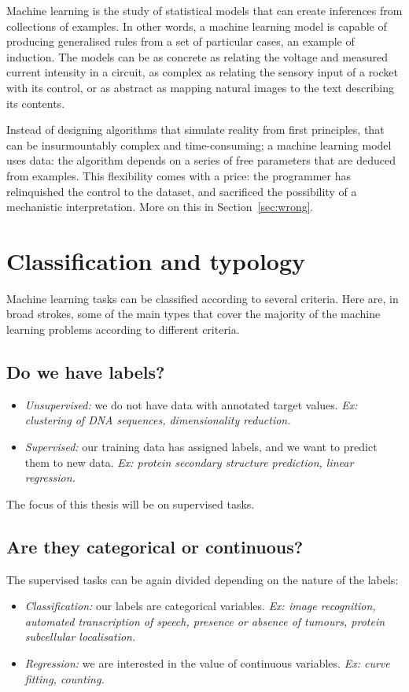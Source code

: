 Machine learning 
is the study of statistical models that can create inferences from collections of examples. 
In other words, a machine learning model is capable of producing generalised rules from a set of particular cases, an example of induction.
The models can be as concrete as relating the voltage and measured current intensity in a circuit, as complex as relating the sensory input of a rocket with its control, or as abstract as mapping natural images to the text describing its contents.

Instead of designing algorithms that simulate reality from first principles, that can be insurmountably complex and time-consuming; a machine learning model uses data: the algorithm depends on a series of free parameters that are deduced from examples.
This flexibility comes with a price: the programmer has relinquished the control to the dataset, and sacrificed the possibility of a mechanistic interpretation.
More on this in Section~\ref{sec:wrong}.

\section{Classification and typology}
Machine learning tasks can be classified according to several criteria.
Here are, in broad strokes, some of the main types that cover the majority of the machine learning problems according to different criteria.

\subsection{Do we have labels?}
\begin{itemize}
\item \emph{Unsupervised:} we do not have data with annotated target values. \emph{Ex: clustering of DNA sequences, dimensionality reduction.}
\item \emph{Supervised:} our training data has assigned labels, and we want to predict them to new data. \emph{Ex: protein secondary structure prediction, linear regression.}
\end{itemize}

The focus of this thesis will be on supervised tasks.

\subsection[Categorical or continuous?]{Are they categorical or continuous?}
The supervised tasks can be again divided depending on the nature of the labels:
\begin{itemize}
\item \emph{Classification:} our labels are categorical variables. \emph{Ex: image recognition, automated transcription of speech, presence or absence of tumours, protein subcellular localisation.}
\item \emph{Regression:} we are interested in the value of continuous variables. \emph{Ex: curve fitting, counting.}
\end{itemize}

